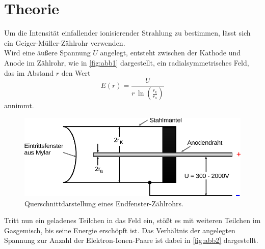 \section{Theorie}
\label{sec:theorie}

Um die Intensität einfallender ionisierender Strahlung zu bestimmen, lässt sich ein Geiger-Müller-Zählrohr verwenden. \\

Wird eine äußere Spannung $U$ angelegt, entsteht zwischen der Kathode und Anode im Zählrohr, wie in \autoref{fig:abb1} dargestellt,
ein radialsymmetrisches Feld, das im Abstand $r$ den Wert
\begin{equation*}
    E(r) = \frac{U}{r \,\ln \left(\frac{r_k}{r_a} \right)}
\end{equation*}
annimmt.

\begin{figure}[H]
    \centering
    \includegraphics{figures/Abb_1.pdf}
    \caption{Querschnittdarstellung eines
    Endfenster-Zählrohrs\cite{ap03}.}
    \label{fig:abb1}
\end{figure}

Tritt nun ein geladenes Teilchen in das 
Feld ein, stößt es mit weiteren Teilchen
im Gasgemisch, bis seine Energie erschöpft ist.
Das Verhältnis der angelegten Spannung zur
Anzahl der Elektron-Ionen-Paare ist dabei in
\autoref{fig:abb2} dargestellt.

